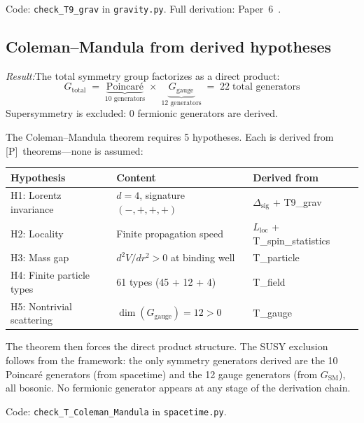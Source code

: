 \documentclass[11pt]{article}
\newcommand{\Lloc}{L_{\mathrm{loc}}}
\begin{document}
Code: \texttt{check\_T9\_grav} in \texttt{gravity.py}.  Full derivation: Paper~6~\cite{P6}.


\subsection{Coleman--Mandula from derived hypotheses}

\begin{tcolorbox}[apfbox, title={T\_Coleman\_Mandula: Spacetime--Internal Factorization}]
\textit{Result:}\quad The total symmetry group factorizes as a direct product:
\begin{equation}
G_{\mathrm{total}} \;=\; \underbrace{\text{Poincar\'e}}_{\text{10 generators}} \;\times\; \underbrace{G_{\mathrm{gauge}}}_{\text{12 generators}} \;=\; 22 \;\text{total generators}
\end{equation}
Supersymmetry is excluded: 0 fermionic generators are derived.
\end{tcolorbox}

The Coleman--Mandula theorem requires 5 hypotheses.  Each is derived from [P]~theorems---none is assumed:

\smallskip
\begin{center}
\small
\begin{tabular}{lll}
\toprule
\textbf{Hypothesis} & \textbf{Content} & \textbf{Derived from} \\
\midrule
H1: Lorentz invariance & $d = 4$, signature $(-,+,+,+)$ & $\Delta_{\mathrm{sig}}$ + T9\_grav \\
H2: Locality & Finite propagation speed & $\Lloc$ + T\_spin\_statistics \\
H3: Mass gap & $d^2V/dr^2 > 0$ at binding well & T\_particle \\
H4: Finite particle types & 61 types (45 + 12 + 4) & T\_field \\
H5: Nontrivial scattering & $\dim(G_{\mathrm{gauge}}) = 12 > 0$ & T\_gauge \\
\bottomrule
\end{tabular}
\end{center}
\smallskip

The theorem then forces the direct product structure.  The SUSY exclusion follows from the framework: the only symmetry generators derived are the 10 Poincar\'e generators (from spacetime) and the 12 gauge generators (from $G_{\mathrm{SM}}$), all bosonic.  No fermionic generator appears at any stage of the derivation chain.

Code: \texttt{check\_T\_Coleman\_Mandula} in \texttt{spacetime.py}.
\end{document}
